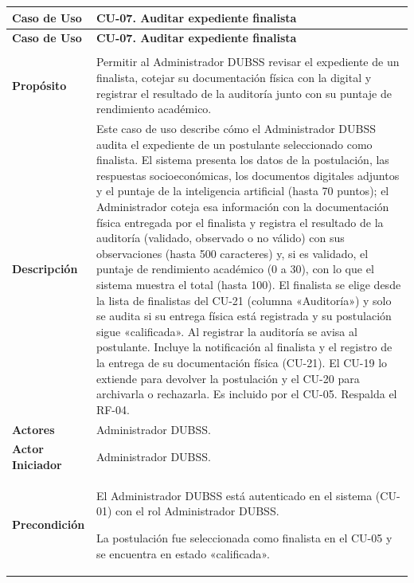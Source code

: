\begin{longtable}{>{\raggedright\arraybackslash}p{2.9cm} >{\raggedright\arraybackslash}p{12.6cm}}
\toprule
\textbf{Caso de Uso} & \textbf{CU-07. Auditar expediente finalista} \\
\midrule
\endfirsthead
\toprule
\textbf{Caso de Uso} & \textbf{CU-07. Auditar expediente finalista} \\
\midrule
\endhead
\endfoot
\bottomrule
\multicolumn{2}{l}{\textit{Nota.} Elaboración propia.} \\
\endlastfoot
\textbf{Propósito} & Permitir al Administrador DUBSS revisar el expediente de un finalista, cotejar su documentación física con la digital y registrar el resultado de la auditoría junto con su puntaje de rendimiento académico. \\
\midrule
\textbf{Descripción} & Este caso de uso describe cómo el Administrador DUBSS audita el expediente de un postulante seleccionado como finalista. El sistema presenta los datos de la postulación, las respuestas socioeconómicas, los documentos digitales adjuntos y el puntaje de la inteligencia artificial (hasta 70 puntos); el Administrador coteja esa información con la documentación física entregada por el finalista y registra el resultado de la auditoría (validado, observado o no válido) con sus observaciones (hasta 500 caracteres) y, si es validado, el puntaje de rendimiento académico (0 a 30), con lo que el sistema muestra el total (hasta 100). El finalista se elige desde la lista de finalistas del CU-21 (columna «Auditoría») y solo se audita si su entrega física está registrada y su postulación sigue «calificada». Al registrar la auditoría se avisa al postulante. Incluye la notificación al finalista y el registro de la entrega de su documentación física (CU-21). El CU-19 lo extiende para devolver la postulación y el CU-20 para archivarla o rechazarla. Es incluido por el CU-05. Respalda el RF-04. \\
\midrule
\textbf{Actores} & Administrador DUBSS. \\
\midrule
\textbf{Actor Iniciador} & Administrador DUBSS. \\
\midrule
\textbf{Precondición} & \vspace{-\baselineskip}\begin{cuvin}
    \item El Administrador DUBSS está autenticado en el sistema (CU-01) con el rol Administrador DUBSS.
    \item La postulación fue seleccionada como finalista en el CU-05 y se encuentra en estado «calificada».

\end{cuvin}
\end{longtable}
